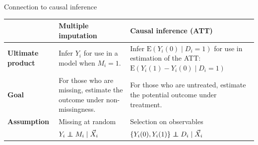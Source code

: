 \documentclass{beamer}
\def\independenT#1#2{\mathrel{\rlap{$#1#2$}\mkern2mu{#1#2}}}
\newcommand\indep{\protect\mathpalette{\protect\independenT}{\perp}}
\newcommand\bblue[1]{{\color{blue}\textbf{#1}}}
\newcommand\bgreen[1]{{\color{olive}\textbf{#1}}}
\newcommand\E{\text{E}}
\begin{document}

\begin{frame}{Connection to causal inference}

\renewcommand{\arraystretch}{1.5}
{\footnotesize
\begin{tabularx}{\linewidth}{ l X X}
& \bblue{Multiple imputation} & \bblue{Causal inference (ATT)} \\
\hline
\bgreen{Ultimate product} & Infer $Y_i$ for use in a model when $M_i = 1$. & Infer $\E(Y_i(0)\mid D_i = 1)$ for use in estimation of the ATT: $\E(Y_i(1) - Y_i(0) \mid D_i = 1)$  \\
\bgreen{Goal} & For those who are missing, estimate the outcome under non-missingness. & For those who are untreated, estimate the potential outcome under treatment. \\
\bgreen{Assumption} & Missing at random & Selection on observables \\
& $Y_{i}\indep M_i \mid \vec{X}_{i}$ & $\{Y_i(0),Y_i(1)\} \indep D_i \mid \vec{X}_i$
\end{tabularx}
}
\renewcommand{\arraystretch}{1}

\end{frame}
\end{document}
